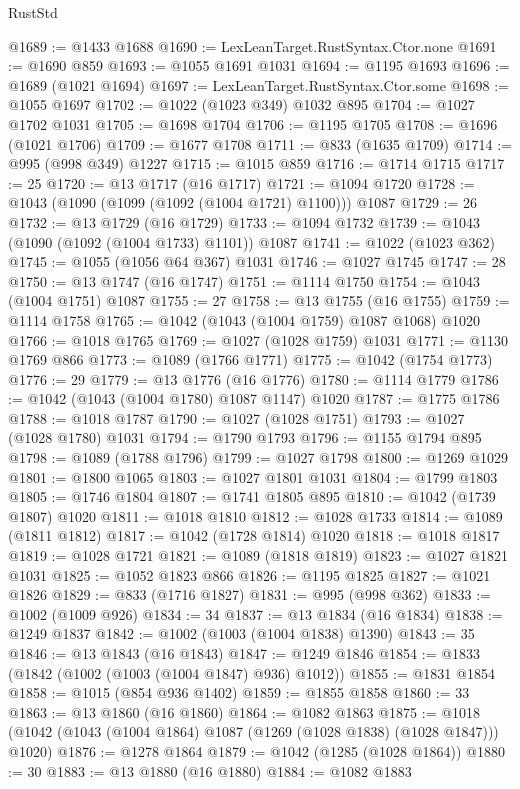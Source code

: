 \begin{lexlean}{RustStd}
\begin{coremodule}
{\begin{coremodule}
{{{{{{{{{{{{{{{{{{{{{{{{{{@1689 := @1433 @1688
@1690 := LexLeanTarget.RustSyntax.Ctor.none
@1691 := @1690 @859
@1693 := @1055 @1691 @1031
@1694 := @1195 @1693
@1696 := @1689 (@1021 @1694)
@1697 := LexLeanTarget.RustSyntax.Ctor.some
@1698 := @1055 @1697
@1702 := @1022 (@1023 @349) @1032 @895
@1704 := @1027 @1702 @1031
@1705 := @1698 @1704
@1706 := @1195 @1705
@1708 := @1696 (@1021 @1706)
@1709 := @1677 @1708
@1711 := @833 (@1635 @1709)
@1714 := @995 (@998 @349) @1227
@1715 := @1015 @859
@1716 := @1714 @1715
@1717 := 25
@1720 := @13 @1717 (@16 @1717)
@1721 := @1094 @1720
@1728 := @1043 (@1090 (@1099 (@1092 (@1004 @1721) @1100))) @1087
@1729 := 26
@1732 := @13 @1729 (@16 @1729)
@1733 := @1094 @1732
@1739 := @1043 (@1090 (@1092 (@1004 @1733) @1101)) @1087
@1741 := @1022 (@1023 @362)
@1745 := @1055 (@1056 @64 @367) @1031
@1746 := @1027 @1745
@1747 := 28
@1750 := @13 @1747 (@16 @1747)
@1751 := @1114 @1750
@1754 := @1043 (@1004 @1751) @1087
@1755 := 27
@1758 := @13 @1755 (@16 @1755)
@1759 := @1114 @1758
@1765 := @1042 (@1043 (@1004 @1759) @1087 @1068) @1020
@1766 := @1018 @1765
@1769 := @1027 (@1028 @1759) @1031
@1771 := @1130 @1769 @866
@1773 := @1089 (@1766 @1771)
@1775 := @1042 (@1754 @1773)
@1776 := 29
@1779 := @13 @1776 (@16 @1776)
@1780 := @1114 @1779
@1786 := @1042 (@1043 (@1004 @1780) @1087 @1147) @1020
@1787 := @1775 @1786
@1788 := @1018 @1787
@1790 := @1027 (@1028 @1751)
@1793 := @1027 (@1028 @1780) @1031
@1794 := @1790 @1793
@1796 := @1155 @1794 @895
@1798 := @1089 (@1788 @1796)
@1799 := @1027 @1798
@1800 := @1269 @1029
@1801 := @1800 @1065
@1803 := @1027 @1801 @1031
@1804 := @1799 @1803
@1805 := @1746 @1804
@1807 := @1741 @1805 @895
@1810 := @1042 (@1739 @1807) @1020
@1811 := @1018 @1810
@1812 := @1028 @1733
@1814 := @1089 (@1811 @1812)
@1817 := @1042 (@1728 @1814) @1020
@1818 := @1018 @1817
@1819 := @1028 @1721
@1821 := @1089 (@1818 @1819)
@1823 := @1027 @1821 @1031
@1825 := @1052 @1823 @866
@1826 := @1195 @1825
@1827 := @1021 @1826
@1829 := @833 (@1716 @1827)
@1831 := @995 (@998 @362)
@1833 := @1002 (@1009 @926)
@1834 := 34
@1837 := @13 @1834 (@16 @1834)
@1838 := @1249 @1837
@1842 := @1002 (@1003 (@1004 @1838) @1390)
@1843 := 35
@1846 := @13 @1843 (@16 @1843)
@1847 := @1249 @1846
@1854 := @1833 (@1842 (@1002 (@1003 (@1004 @1847) @936) @1012))
@1855 := @1831 @1854
@1858 := @1015 (@854 @936 @1402)
@1859 := @1855 @1858
@1860 := 33
@1863 := @13 @1860 (@16 @1860)
@1864 := @1082 @1863
@1875 := @1018 (@1042 (@1043 (@1004 @1864) @1087 (@1269 (@1028 @1838) (@1028 @1847))) @1020)
@1876 := @1278 @1864
@1879 := @1042 (@1285 (@1028 @1864))
@1880 := 30
@1883 := @13 @1880 (@16 @1880)
@1884 := @1082 @1883
}}}}}}}}}}}}}}}}}}}}}}}}}}
\end{coremodule}}
\end{coremodule}
\end{lexlean}
